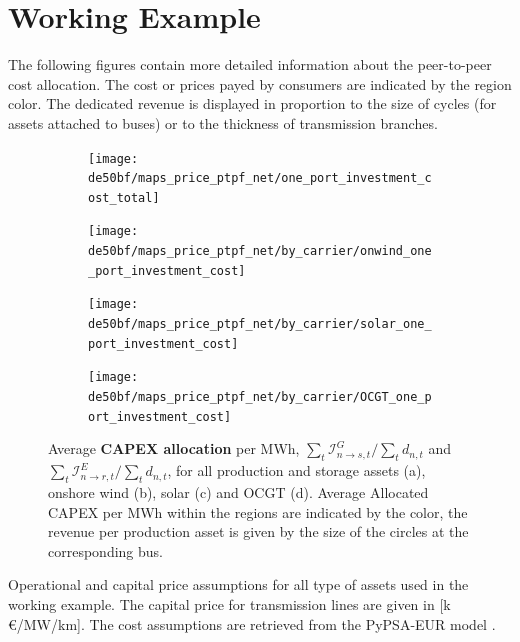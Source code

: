 \documentclass[11pt,twocolumn]{article}
\newcommand{\demand}[1][n]{d_{#1,t}}
\newcommand{\capexgeneration}{\mathcal{I}^G}
\newcommand{\capexstorage}{\mathcal{I}^E}
\newcommand{\allocatecapexgeneration}[1][n \rightarrow s,t]{\capexgeneration_{#1}}
\newcommand{\allocatecapexstorage}[1][n \rightarrow r, t]{\capexstorage_{#1}}
\begin{document}
\section{Working Example}
The following figures contain more detailed information about the peer-to-peer cost allocation. The cost or prices payed by consumers are indicated by the region color. The dedicated revenue is displayed in proportion to the size of cycles (for assets attached to buses) or to the thickness of transmission branches.    
\begin{figure}
    \centering
    \begin{subfigure}[c]{.49\linewidth}
        \texttt{[image: de50bf/maps\_price\_ptpf\_net/one\_port\_investment\_cost\_total]}
        \label{fig:total_capex}
    \end{subfigure}
    \begin{subfigure}[c]{.49\linewidth}
        \texttt{[image: de50bf/maps\_price\_ptpf\_net/by\_carrier/onwind\_one\_port\_investment\_cost]}
        \label{fig:onshore_capex}
    \end{subfigure}
    \begin{subfigure}[c]{.49\linewidth}
        \texttt{[image: de50bf/maps\_price\_ptpf\_net/by\_carrier/solar\_one\_port\_investment\_cost]}
        \label{fig:solar_capex}
    \end{subfigure}
    \begin{subfigure}[c]{.49\linewidth}
        \texttt{[image: de50bf/maps\_price\_ptpf\_net/by\_carrier/OCGT\_one\_port\_investment\_cost]}
        \label{fig:ocgt_capex}
    \end{subfigure}
    \caption{Average \textbf{CAPEX allocation} per MWh, $\sum_t \allocatecapexgeneration / \sum_t \demand$ and $\sum_t \allocatecapexstorage / \sum_t \demand$, for all production and storage assets (a), onshore wind (b), solar (c) and OCGT (d). Average Allocated CAPEX per MWh within the regions are indicated by the color, the revenue per production asset is given by the size of the circles at the corresponding bus.}
    \label{fig:capex_price}
\end{figure}

\begin{table}[h]
    \centering
        
    \caption{Operational and capital price assumptions for all type of assets used in the working example. The capital price for transmission lines are given in [k\,\euro/MW/km]. The cost assumptions are retrieved from the PyPSA-EUR model \cite{horsch_jonas_pypsa-eur_2020}.}
    \label{tab:cost_assumptions}
\end{table} 
\end{document}

